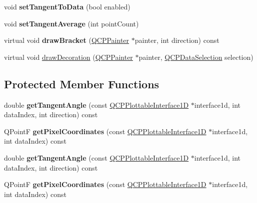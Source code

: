 \begin{DoxyCompactItemize}
void {\bfseries set\+Tangent\+To\+Data} (bool enabled)
\item 
\mbox{\label{class_q_c_p_selection_decorator_bracket_adb2d0876f25a77c88042b70818f1d6e4}} 
void {\bfseries set\+Tangent\+Average} (int point\+Count)
\item 
\mbox{\label{class_q_c_p_selection_decorator_bracket_acd07770eab014f49d7998670fedcc2c6}} 
virtual void {\bfseries draw\+Bracket} (\hyperlink{class_q_c_p_painter}{Q\+C\+P\+Painter} $\ast$painter, int direction) const
\item 
virtual void \hyperlink{class_q_c_p_selection_decorator_bracket_ae96f09ef95abf81a2514d54149387097}{draw\+Decoration} (\hyperlink{class_q_c_p_painter}{Q\+C\+P\+Painter} $\ast$painter, \hyperlink{class_q_c_p_data_selection}{Q\+C\+P\+Data\+Selection} selection)
\end{DoxyCompactItemize}
\subsection*{Protected Member Functions}
\begin{DoxyCompactItemize}
\item 
\mbox{\label{class_q_c_p_selection_decorator_bracket_ac002e20586950bf5c91a399863769c61}} 
double {\bfseries get\+Tangent\+Angle} (const \hyperlink{class_q_c_p_plottable_interface1_d}{Q\+C\+P\+Plottable\+Interface1D} $\ast$interface1d, int data\+Index, int direction) const
\item 
\mbox{\label{class_q_c_p_selection_decorator_bracket_a9925ed667e8a645fcb9949bd02ee4a19}} 
Q\+PointF {\bfseries get\+Pixel\+Coordinates} (const \hyperlink{class_q_c_p_plottable_interface1_d}{Q\+C\+P\+Plottable\+Interface1D} $\ast$interface1d, int data\+Index) const
\item 
\mbox{\label{class_q_c_p_selection_decorator_bracket_ac002e20586950bf5c91a399863769c61}} 
double {\bfseries get\+Tangent\+Angle} (const \hyperlink{class_q_c_p_plottable_interface1_d}{Q\+C\+P\+Plottable\+Interface1D} $\ast$interface1d, int data\+Index, int direction) const
\item 
\mbox{\label{class_q_c_p_selection_decorator_bracket_a9925ed667e8a645fcb9949bd02ee4a19}} 
Q\+PointF {\bfseries get\+Pixel\+Coordinates} (const \hyperlink{class_q_c_p_plottable_interface1_d}{Q\+C\+P\+Plottable\+Interface1D} $\ast$interface1d, int data\+Index) const
\end{DoxyCompactItemize}
